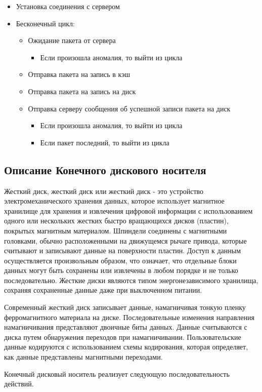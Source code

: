 \begin{itemize}
\item Установка соединения с сервером
\item Бесконечный цикл:
	\begin{itemize}
		\item Ожидание пакета от сервера
		\begin{itemize}
			\item Если произошла аномалия, то выйти из цикла
		\end{itemize}
		
		\item Отправка пакета на запись в кэш
		\item Отправка пакета на запись на диск		
		\item  Отправка серверу сообщения об успешной записи пакета на диск 
		\begin{itemize}
			\item Если произошла аномалия, то выйти из цикла
		\end{itemize}
		\begin{itemize}
			\item Если пакет последний, то выйти из цикла
		\end{itemize}
	\end{itemize}
\end{itemize}

\subsection{Описание Конечного дискового носителя}
\par 
Жесткий диск, жесткий диск или жесткий диск - это устройство электромеханического хранения данных, которое использует магнитное хранилище для хранения и извлечения цифровой информации с использованием одного или нескольких жестких быстро вращающихся дисков (пластин), покрытых магнитным материалом. Шпиндели соединены с магнитными головками, обычно расположенными на движущемся рычаге привода, которые считывают и записывают данные на поверхности пластин. Доступ к данным осуществляется произвольным образом, что означает, что отдельные блоки данных могут быть сохранены или извлечены в любом порядке и не только последовательно. Жесткие диски являются типом энергонезависимого хранилища, сохраняя сохраненные данные даже при выключенном питании.
\par 
Современный жесткий диск записывает данные, намагничивая тонкую пленку ферромагнитного материала на диске. Последовательные изменения направления намагничивания представляют двоичные биты данных. Данные считываются с диска путем обнаружения переходов при намагничивании. Пользовательские данные кодируются с использованием схемы кодирования, которая определяет, как данные представлены магнитными переходами.
\par 
Конечный дисковый носитель реализует следующую последовательность действий.

